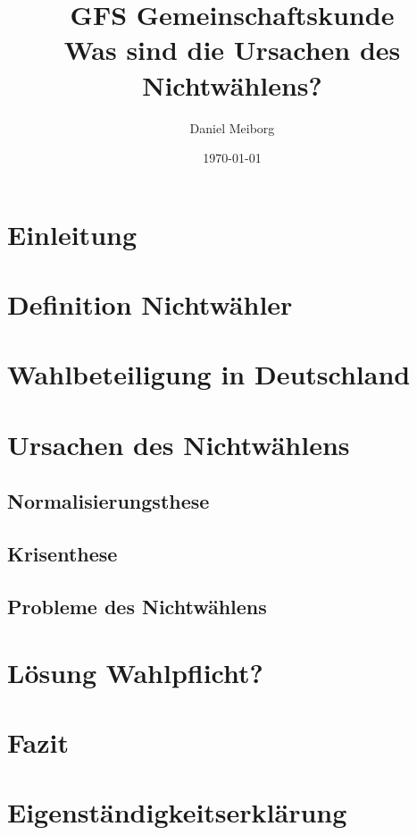 \documentclass[12pt]{article}
\title{
        {GFS Gemeinschaftskunde} \\
    {\large Was sind die Ursachen des Nichtwählens?}\\
}
\author{Daniel Meiborg}
\date{\today}
\begin{document}
    \maketitle
    \newpage

    \tableofcontents
    \newpage


    \section{Einleitung}


    \section{Definition Nichtwähler}


    \section{Wahlbeteiligung in Deutschland}


    \section{Ursachen des Nichtwählens}

    \subsection{Normalisierungsthese}

    \subsection{Krisenthese}

    \subsection{Probleme des Nichtwählens}


    \section{Lösung Wahlpflicht?}


    \section{Fazit}


    \section{Eigenständigkeitserklärung}

    
    
\end{document}
